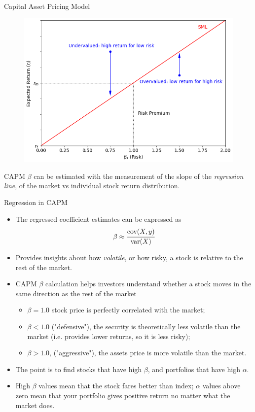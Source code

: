 \documentclass{beamer}
\begin{document}
\begin{frame}{Capital Asset Pricing Model}
  \begin{figure}[h]
    \begin{center}
      \includegraphics[width=0.45\linewidth]{sml}
    \end{center}
  \end{figure}
  CAPM $\beta$ can be estimated with the measurement of the slope of the \emph{regression line}, of the market vs individual stock return distribution.
\end{frame}


\begin{frame}{Regression in CAPM}
  \begin{itemize}
  \item The regressed coefficient estimates can be expressed as
    \begin{equation*}
      \beta \approx \cfrac{\textrm{cov}(X,y)}{\textrm {var}(X)}
    \end{equation*}
  \item Provides insights about how \emph{volatile}, or how risky, a stock is relative to the rest of the market.
  \item CAPM $\beta$ calculation helps investors understand whether a stock moves in the same direction as the rest of the market
    \begin{itemize}
      \item $\beta= 1.0$ stock price is perfectly correlated with the market;
      \item $\beta < 1.0$ ("defensive"), the security is theoretically less volatile than the market (i.e. provides lower returns, so it is less risky);
      \item $\beta > 1.0$, ("aggressive"), the assets price is more volatile than the market.
    \end{itemize}
  \item The point is to find stocks that have high $\beta$, and portfolios that have high $\alpha$. 
  \item High $\beta$ values mean that the stock fares better than index; $\alpha$ values above zero mean that your portfolio gives positive return no matter what the market does.
  \end{itemize}
\end{frame}
\end{document}
